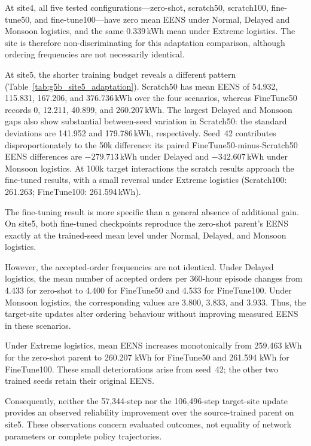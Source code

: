 \begin{revisedblock}
At site4, all five tested configurations---zero-shot, scratch50,
scratch100, fine-tune50, and fine-tune100---have zero mean EENS
under Normal, Delayed and Monsoon logistics, and the same
0.339\,kWh mean under Extreme logistics. The site is therefore
non-discriminating for this adaptation comparison, although
ordering frequencies are not necessarily identical.

At site5, the shorter training budget reveals a different pattern
(Table~\ref{tab:g5b_site5_adaptation}). Scratch50 has mean EENS
of 54.932, 115.831, 167.206, and 376.736\,kWh over the four
scenarios, whereas FineTune50 records 0, 12.211, 40.899,
and 260.207\,kWh. The largest Delayed and Monsoon gaps
also show substantial between-seed variation in Scratch50:
the standard deviations are 141.952 and 179.786\,kWh,
respectively. Seed~42 contributes disproportionately to the
50k difference: its paired FineTune50-minus-Scratch50 EENS
differences are $-279.713$\,kWh under Delayed and
$-342.607$\,kWh under Monsoon logistics. At 100k target interactions the scratch results
approach the fine-tuned results, with a small reversal under
Extreme logistics (Scratch100: 261.263; FineTune100: 261.594\,kWh).

The fine-tuning result is more specific than a general
absence of additional gain. On site5, both fine-tuned
checkpoints reproduce the zero-shot parent's EENS
exactly at the trained-seed mean level under Normal,
Delayed, and Monsoon logistics.

However, the accepted-order frequencies are not
identical. Under Delayed logistics, the mean number
of accepted orders per 360-hour episode changes from
4.433 for zero-shot to 4.400 for FineTune50 and 4.533
for FineTune100. Under Monsoon logistics, the
corresponding values are 3.800, 3.833, and 3.933.
Thus, the target-site updates alter ordering behaviour
without improving measured EENS in these scenarios.

Under Extreme logistics, mean EENS increases
monotonically from 259.463 kWh for the zero-shot
parent to 260.207 kWh for FineTune50 and
261.594 kWh for FineTune100. These small
deteriorations arise from seed~42; the other two
trained seeds retain their original EENS.

Consequently, neither the 57,344-step nor the
106,496-step target-site update provides an observed
reliability improvement over the source-trained
parent on site5. These observations concern
evaluated outcomes, not equality of network
parameters or complete policy trajectories.


\end{revisedblock}
